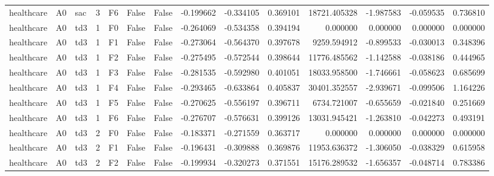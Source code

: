 \begin{tabular}{lllrlllrrrrrrr}
healthcare &      A0 &       sac &     3 &  F6 &           False &            False & -0.199662 & -0.334105 & 0.369101 &     18721.405328 &          -1.987583 &       -0.059535 &            0.736810 \\
healthcare &      A0 &       td3 &     1 &  F0 &           False &            False & -0.264069 & -0.534358 & 0.394194 &         0.000000 &           0.000000 &        0.000000 &            0.000000 \\
healthcare &      A0 &       td3 &     1 &  F1 &           False &            False & -0.273064 & -0.564370 & 0.397678 &      9259.594912 &          -0.899533 &       -0.030013 &            0.348396 \\
healthcare &      A0 &       td3 &     1 &  F2 &           False &            False & -0.275495 & -0.572544 & 0.398644 &     11776.485562 &          -1.142588 &       -0.038186 &            0.444965 \\
healthcare &      A0 &       td3 &     1 &  F3 &           False &            False & -0.281535 & -0.592980 & 0.401051 &     18033.958500 &          -1.746661 &       -0.058623 &            0.685699 \\
healthcare &      A0 &       td3 &     1 &  F4 &           False &            False & -0.293465 & -0.633864 & 0.405837 &     30401.352557 &          -2.939671 &       -0.099506 &            1.164226 \\
healthcare &      A0 &       td3 &     1 &  F5 &           False &            False & -0.270625 & -0.556197 & 0.396711 &      6734.721007 &          -0.655659 &       -0.021840 &            0.251669 \\
healthcare &      A0 &       td3 &     1 &  F6 &           False &            False & -0.276707 & -0.576631 & 0.399126 &     13031.945421 &          -1.263810 &       -0.042273 &            0.493191 \\
healthcare &      A0 &       td3 &     2 &  F0 &           False &            False & -0.183371 & -0.271559 & 0.363717 &         0.000000 &           0.000000 &        0.000000 &            0.000000 \\
healthcare &      A0 &       td3 &     2 &  F1 &           False &            False & -0.196431 & -0.309888 & 0.369876 &     11953.636372 &          -1.306050 &       -0.038329 &            0.615958 \\
healthcare &      A0 &       td3 &     2 &  F2 &           False &            False & -0.199934 & -0.320273 & 0.371551 &     15176.289532 &          -1.656357 &       -0.048714 &            0.783386 \\

\end{tabular}
